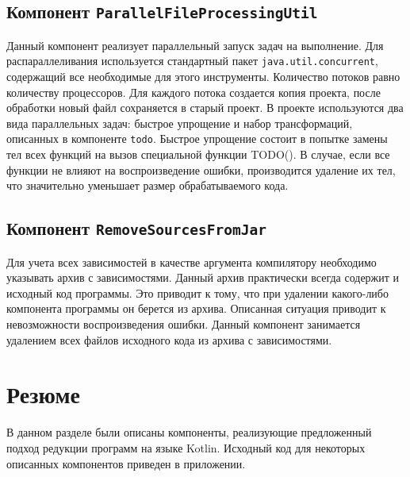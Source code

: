 \subsection{Компонент \texttt{ParallelFileProcessingUtil}}
Данный компонент реализует параллельный запуск задач на выполнение. Для распараллеливания используется стандартный пакет \texttt{java.util.concurrent}, содержащий все необходимые для этого инструменты. Количество потоков равно количеству процессоров. Для каждого потока создается копия проекта, после обработки новый файл сохраняется в старый проект. В проекте используются два вида параллельных задач: быстрое упрощение и набор трансформаций, описанных в компоненте \texttt{todo}. Быстрое упрощение состоит в попытке замены тел всех функций на вызов специальной функции TODO(). В случае, если все функции не влияют на воспроизведение ошибки, производится удаление их тел, что значительно уменьшает размер обрабатываемого кода. 

\subsection{Компонент \texttt{RemoveSourcesFromJar}}
Для учета всех зависимостей в качестве аргумента компилятору необходимо указывать архив с зависимостями. Данный архив практически всегда содержит и исходный код программы. Это приводит к тому, что при удалении какого-либо компонента программы он берется из архива. Описанная ситуация приводит к невозможности воспроизведения ошибки. Данный компонент занимается удалением всех файлов исходного кода из архива с зависимостями.

\section{Резюме}
В данном разделе были описаны компоненты, реализующие предложенный подход редукции программ на языке Kotlin. Исходный код для некоторых описанных компонентов приведен в приложении.